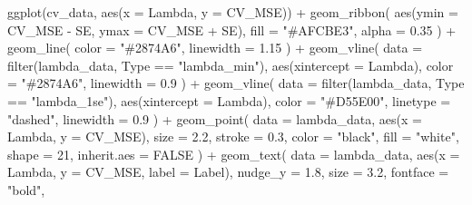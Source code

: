 \documentclass[
  letterpaper,
  DIV=11,
  numbers=noendperiod]{scrreprt}
\newenvironment{Shaded}{\begin{snugshade}}{\end{snugshade}}
\newcommand{\AttributeTok}[1]{\textcolor[rgb]{0.40,0.45,0.13}{#1}}
\newcommand{\ConstantTok}[1]{\textcolor[rgb]{0.56,0.35,0.01}{#1}}
\newcommand{\DecValTok}[1]{\textcolor[rgb]{0.68,0.00,0.00}{#1}}
\newcommand{\FloatTok}[1]{\textcolor[rgb]{0.68,0.00,0.00}{#1}}
\newcommand{\FunctionTok}[1]{\textcolor[rgb]{0.28,0.35,0.67}{#1}}
\newcommand{\NormalTok}[1]{\textcolor[rgb]{0.00,0.23,0.31}{#1}}
\newcommand{\SpecialCharTok}[1]{\textcolor[rgb]{0.37,0.37,0.37}{#1}}
\newcommand{\StringTok}[1]{\textcolor[rgb]{0.13,0.47,0.30}{#1}}
\begin{document}
\begin{Shaded}
\begin{Highlighting}[]
\FunctionTok{ggplot}\NormalTok{(cv\_data, }\FunctionTok{aes}\NormalTok{(}\AttributeTok{x =}\NormalTok{ Lambda, }\AttributeTok{y =}\NormalTok{ CV\_MSE)) }\SpecialCharTok{+}
  \FunctionTok{geom\_ribbon}\NormalTok{(}
    \FunctionTok{aes}\NormalTok{(}\AttributeTok{ymin =}\NormalTok{ CV\_MSE }\SpecialCharTok{{-}}\NormalTok{ SE, }\AttributeTok{ymax =}\NormalTok{ CV\_MSE }\SpecialCharTok{+}\NormalTok{ SE),}
    \AttributeTok{fill =} \StringTok{"\#AFCBE3"}\NormalTok{,}
    \AttributeTok{alpha =} \FloatTok{0.35}
\NormalTok{  ) }\SpecialCharTok{+}
  \FunctionTok{geom\_line}\NormalTok{(}
    \AttributeTok{color =} \StringTok{"\#2874A6"}\NormalTok{,}
    \AttributeTok{linewidth =} \FloatTok{1.15}
\NormalTok{  ) }\SpecialCharTok{+}
  \FunctionTok{geom\_vline}\NormalTok{(}
    \AttributeTok{data =} \FunctionTok{filter}\NormalTok{(lambda\_data, Type }\SpecialCharTok{==} \StringTok{"lambda\_min"}\NormalTok{),}
    \FunctionTok{aes}\NormalTok{(}\AttributeTok{xintercept =}\NormalTok{ Lambda),}
    \AttributeTok{color =} \StringTok{"\#2874A6"}\NormalTok{,}
    \AttributeTok{linewidth =} \FloatTok{0.9}
\NormalTok{  ) }\SpecialCharTok{+}
  \FunctionTok{geom\_vline}\NormalTok{(}
    \AttributeTok{data =} \FunctionTok{filter}\NormalTok{(lambda\_data, Type }\SpecialCharTok{==} \StringTok{"lambda\_1se"}\NormalTok{),}
    \FunctionTok{aes}\NormalTok{(}\AttributeTok{xintercept =}\NormalTok{ Lambda),}
    \AttributeTok{color =} \StringTok{"\#D55E00"}\NormalTok{,}
    \AttributeTok{linetype =} \StringTok{"dashed"}\NormalTok{,}
    \AttributeTok{linewidth =} \FloatTok{0.9}
\NormalTok{  ) }\SpecialCharTok{+}
  \FunctionTok{geom\_point}\NormalTok{(}
    \AttributeTok{data =}\NormalTok{ lambda\_data,}
    \FunctionTok{aes}\NormalTok{(}\AttributeTok{x =}\NormalTok{ Lambda, }\AttributeTok{y =}\NormalTok{ CV\_MSE),}
    \AttributeTok{size =} \FloatTok{2.2}\NormalTok{,}
    \AttributeTok{stroke =} \FloatTok{0.3}\NormalTok{,}
    \AttributeTok{color =} \StringTok{"black"}\NormalTok{,}
    \AttributeTok{fill =} \StringTok{"white"}\NormalTok{,}
    \AttributeTok{shape =} \DecValTok{21}\NormalTok{,}
    \AttributeTok{inherit.aes =} \ConstantTok{FALSE}
\NormalTok{  ) }\SpecialCharTok{+}
  \FunctionTok{geom\_text}\NormalTok{(}
    \AttributeTok{data =}\NormalTok{ lambda\_data,}
    \FunctionTok{aes}\NormalTok{(}\AttributeTok{x =}\NormalTok{ Lambda, }\AttributeTok{y =}\NormalTok{ CV\_MSE, }\AttributeTok{label =}\NormalTok{ Label),}
    \AttributeTok{nudge\_y =} \FloatTok{1.8}\NormalTok{,}
    \AttributeTok{size =} \FloatTok{3.2}\NormalTok{,}
    \AttributeTok{fontface =} \StringTok{"bold"}\NormalTok{,}

\end{Highlighting}
\end{Shaded}
\end{document}
